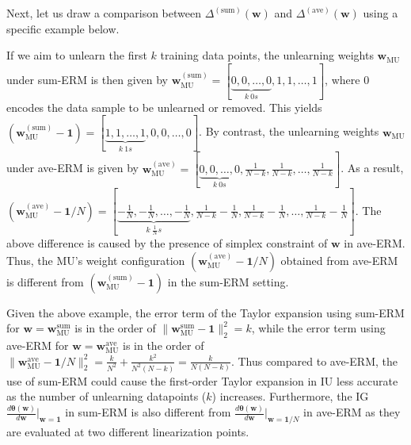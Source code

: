 
Next, let us draw a  comparison between $\Delta^{\mathrm{(sum)}}(\mathbf{w})$ and $\Delta^{\mathrm{(ave)}}(\mathbf{w})$ using a specific example below. 


If we aim to unlearn the first $k$ training data points, the unlearning weights $\mathbf w_{\mathrm{MU}}$ under sum-ERM is then given by  $\mathbf w_{\mathrm{MU}}^{\mathrm{(sum)}} = [\underbrace{0, 0, \ldots, 0}_{k~ 0s}, 1, 1,\ldots, 1]$, where $0$ encodes the data sample to be unlearned or removed. This yields $(\mathbf w_{\mathrm{MU}}^{\mathrm{(sum)}} - \mathbf 1) = [\underbrace{1, 1, \ldots, 1}_{k ~ 1s}, 0, 0, \ldots, 0]$. By contrast, the unlearning weights $\mathbf w_{\mathrm{MU}}$ under ave-ERM is   given by  $\mathbf w_{\mathrm{MU}}^{\mathrm{(ave)}} = [\underbrace{0, 0, \ldots, 0}_{k~ 0s}, \frac{1}{N-k}, \frac{1}{N-k},\ldots, \frac{1}{N-k}]$. As a result, $(\mathbf w_{\mathrm{MU}}^{\mathrm{(ave)}}-\mathbf 1/N) = [\underbrace{-\frac{1}{N}, -\frac{1}{N}, \ldots, -\frac{1}{N}}_{k~ \frac{1}{N}s}, \frac{1}{N-k} - \frac{1}{N}, \frac{1}{N-k}- \frac{1}{N},\ldots, \frac{1}{N-k}- \frac{1}{N}]$. The above difference is caused by the presence of simplex constraint of $\mathbf w$ in ave-ERM. Thus, the MU's weight configuration $(\mathbf w_{\mathrm{MU}}^{\mathrm{(ave)}}-\mathbf 1/N)$ obtained from ave-ERM is different from $(\mathbf w_{\mathrm{MU}}^{\mathrm{(sum)}} - \mathbf 1)$ in the sum-ERM setting. 

   
 

Given the above example, the error term of the Taylor expansion using sum-ERM for $\mathbf w = \mathbf w_{\mathrm{MU}}^{\mathrm{sum}}$ is in the order of $\|\mathbf w_{\mathrm{MU}}^{\mathrm{sum}} - \mathbf 1\|_2^2=k$, while the error term using ave-ERM for $\mathbf w = \mathbf w_{\mathrm{MU}}^{\mathrm{ave}}$ is in the order of $\|\mathbf w_{\mathrm{MU}}^{\mathrm{ave}} - \mathbf 1/N\|_2^2=\frac{k}{N^2} + \frac{k^2}{N^2(N-k)} = \frac{k}{N(N-k)}$. Thus compared to ave-ERM, the use of sum-ERM could cause the first-order Taylor expansion in IU less accurate as the number of unlearning datapoints ($k$) increases. Furthermore, the IG $\frac{d\boldsymbol\theta(\mathbf w)}{d\mathbf w}|_{\mathbf w= \mathbf 1}$ in sum-ERM is also different from $\frac{d\boldsymbol\theta(\mathbf w)}{d\mathbf w}|_{\mathbf w= \mathbf 1/N}$ in ave-ERM as they are evaluated at two different linearization points. 


